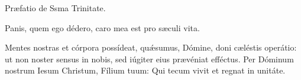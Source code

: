 Præfatio de Ssma Trinitate.
\finishfulltextelement

\label{communion}
Panis, quem ego dédero, caro mea est pro sæculi vita.
\finishfulltextelement
{}

\label{postcommunion}
Mentes nostras et córpora possídeat, quǽsumus, Dómine, doni cæléstis
operátio: ut non noster sensus in nobis, sed iúgiter eius prævéniat efféctus.
Per Dóminum nostrum Iesum Christum, Fílium tuum: Qui tecum vivit et regnat in
unitáte.
\finishfulltextelement
